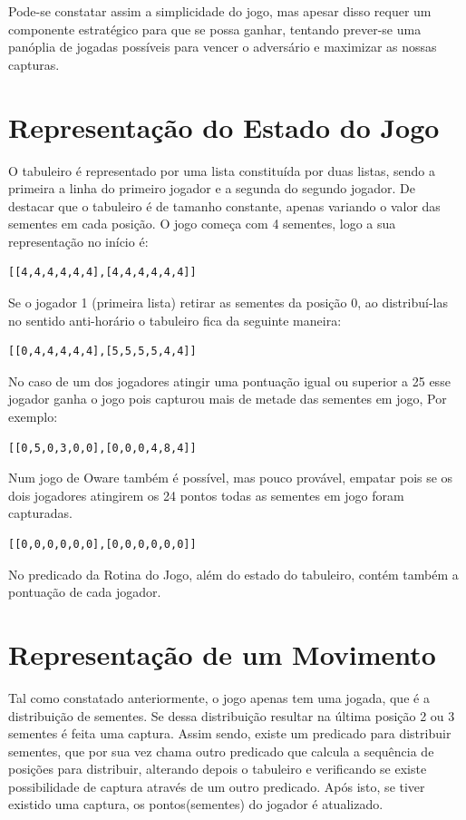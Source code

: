 \documentclass[15pt,a4paper]{article}
\begin{document}
Pode-se constatar assim a simplicidade do jogo, mas apesar disso requer um componente estratégico para que se possa ganhar, tentando prever-se uma panóplia de jogadas possíveis para vencer o adversário e maximizar as nossas capturas.

\section{Representação do Estado do Jogo}
O tabuleiro é representado por uma lista constituída por duas listas, sendo a primeira a linha do primeiro jogador e a segunda do segundo jogador. De destacar que o tabuleiro é de tamanho constante, apenas variando o valor das sementes em cada posição. O jogo começa com 4 sementes, logo a sua representação no início é:
\begin{center}
\begin{verbatim}
[[4,4,4,4,4,4],[4,4,4,4,4,4]]
\end{verbatim}
\end{center}

\indent Se o jogador 1 (primeira lista) retirar as sementes da posição 0, ao distribuí-las no sentido anti-horário o tabuleiro fica da seguinte maneira:
 \begin{verbatim}
[[0,4,4,4,4,4],[5,5,5,5,4,4]]
\end{verbatim}

\indent No caso de um dos jogadores atingir uma pontuação igual ou superior a 25 esse jogador ganha o jogo pois capturou mais de metade das sementes em jogo, Por exemplo:
 \begin{verbatim}
[[0,5,0,3,0,0],[0,0,0,4,8,4]]
\end{verbatim} 

\indent Num jogo de Oware também é possível, mas pouco provável, empatar pois se os dois jogadores atingirem os 24 pontos todas as sementes em jogo foram capturadas.
 \begin{verbatim}
[[0,0,0,0,0,0],[0,0,0,0,0,0]]
\end{verbatim}

No predicado da Rotina do Jogo, além do estado do tabuleiro, contém também a pontuação de cada jogador.




\section{Representação de um Movimento}
Tal como constatado anteriormente, o jogo apenas tem uma jogada, que é a distribuição de sementes. Se dessa distribuição resultar na última posição 2 ou 3 sementes é feita uma captura. Assim sendo, existe um predicado para distribuir sementes, que por sua vez chama outro predicado que calcula a sequência de posições para distribuir, alterando depois o tabuleiro e 
verificando se existe possibilidade de captura através de um outro predicado. Após isto, se tiver existido uma captura, os pontos(sementes) do jogador é atualizado.
\end{document}
